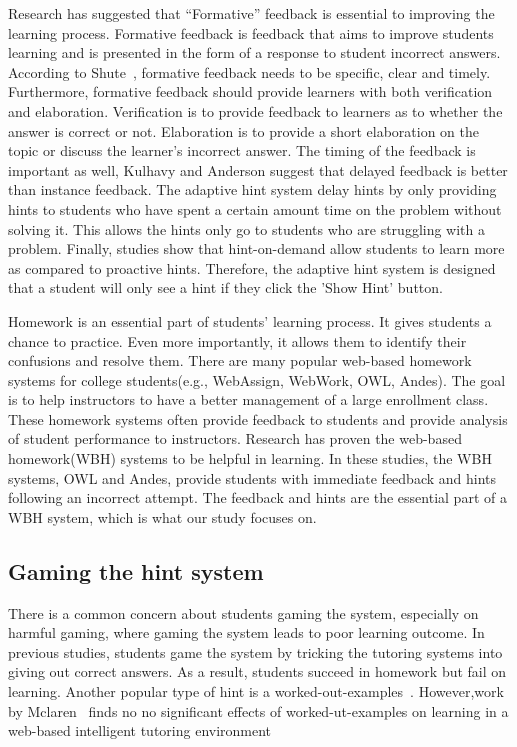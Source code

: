 \documentclass{sigchi/sigchi}
\begin{document}
Research has suggested that ``Formative'' feedback is essential to
improving the learning
process\cite{Azevedo1995}\cite{Bangert-Drowns1991}. Formative feedback
is feedback that aims to improve students learning and is presented in
the form of a response to student incorrect
answers\cite{Shute2008}. According to Shute~\cite{Shute2008},
formative feedback needs to be specific, clear and
timely. Furthermore, formative feedback should provide learners with
both verification and
elaboration\cite{Mason2001}\cite{Bangert-Drowns1991}. Verification is
to provide feedback to learners as to whether the answer is correct or
not. Elaboration is to provide a short elaboration on the topic or
discuss the learner's incorrect answer. The timing of the feedback is
important as well, Kulhavy and Anderson suggest that delayed feedback
is better than instance feedback\cite{Kulhavy1972}. The adaptive hint
system delay hints by only providing hints to students who have spent
a certain amount time on the problem without solving it. This allows
the hints only go to students who are struggling with a
problem. Finally, studies show that hint-on-demand allow students to
learn more as compared to proactive hints\cite{Razzaq2010}. Therefore,
the adaptive hint system is designed that a student will only see a
hint if they click the 'Show Hint' button.

Homework is an essential part of students' learning
process\cite{Cooper2006}. It gives students a chance to practice. Even
more importantly, it allows them to identify their confusions and
resolve them. There are many popular web-based homework systems for
college students(e.g., WebAssign, WebWork, OWL, Andes). The goal is to
help instructors to have a better management of a large enrollment
class. These homework systems often provide feedback to students and
provide analysis of student performance to instructors. Research has
proven the web-based homework(WBH) systems to be helpful in
learning\cite{MestHartRath2002}\cite{Vanlehn2005}. In these studies,
the WBH systems, OWL and Andes, provide students with immediate
feedback and hints following an incorrect
attempt\cite{MestHartRath2002}\cite{Vanlehn2005}. The feedback and
hints are the essential part of a WBH system, which is what our study
focuses on.

\subsection*{Gaming the hint system}

There is a common concern about students gaming the system, especially
on harmful gaming, where gaming the system leads to poor learning
outcome\cite{Baker2004}\cite{Baker2005}. In previous studies, students
game the system by tricking the tutoring systems into giving out
correct answers\cite{Baker2004Off-task}. As a result, students succeed
in homework but fail on learning. Another popular type of hint is a
worked-out-examples~\cite{Atkinson2000}.  However,work by
Mclaren~\cite{McLaren2006} finds no no significant effects of
worked-ut-examples on learning in a web-based intelligent tutoring
environment
\end{document}
